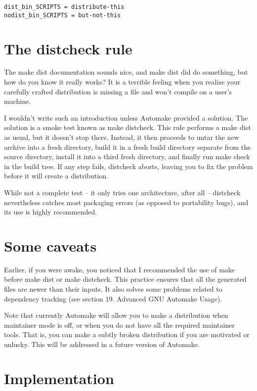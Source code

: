\begin{Verbatim}[frame=single]
dist_bin_SCRIPTS = distribute-this
nodist_bin_SCRIPTS = but-not-this
\end{Verbatim}

\section{The distcheck rule}

The make dist documentation sounds nice, and make dist did do something, but how do you know it really works? It is a terrible feeling when you realize your carefully crafted distribution is missing a file and won't compile on a user's machine.

I wouldn't write such an introduction unless Automake provided a solution. The solution is a smoke test known as make distcheck. This rule performs a make dist as usual, but it doesn't stop there. Instead, it then proceeds to untar the new archive into a fresh directory, build it in a fresh build directory separate from the source directory, install it into a third fresh directory, and finally run make check in the build tree. If any step fails, distcheck aborts, leaving you to fix the problem before it will create a distribution.

While not a complete test -- it only tries one architecture, after all -- distcheck nevertheless catches most packaging errors (as opposed to portability bugs), and its use is highly recommended. 

\section{Some caveats}

Earlier, if you were awake, you noticed that I recommended the use of make before make dist or make distcheck. This practice ensures that all the generated files are newer than their inputs. It also solves some problems related to dependency tracking (see section 19. Advanced GNU Automake Usage).

Note that currently Automake will allow you to make a distribution when maintainer mode is off, or when you do not have all the required maintainer tools. That is, you can make a subtly broken distribution if you are motivated or unlucky. This will be addressed in a future version of Automake. 

\section{Implementation}

